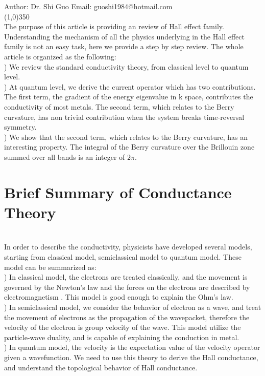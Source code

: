 \documentclass[a4paper]{article}
\begin{document}
Author: Dr. Shi Guo  \hspace{30mm} Email: guoshi1984@hotmail.com\\
\line(1,0){350}\\
\noindent The purpose of this article is providing an review of Hall effect family. Understanding the mechanism of all the physics underlying in the Hall effect family is not an easy task, here we provide a step by step review. The whole article is organized as the following:\\
) We review the standard conductivity theory, from classical level to quantum level.\\
) At quantum level, we derive the current operator which has two contributions. The first term, the gradient of the energy eigenvalue in k space, contributes the conductivity of most metals. The second term, which relates to the Berry curvature, has non trivial contribution when the system breaks time-reversal symmetry.\\
) We show that the second term, which relates to the Berry curvature, has an interesting property. The integral of the Berry curvature over the Brillouin zone summed over all bands is an integer of $2\pi$.\\

\section{Brief Summary of Conductance Theory}\\
\noindent In order to describe the conductivity, physicists have developed several models, starting from classical model, semiclassical model to quantum model. These model can be summarized as:\\
) In classical model, the electrons are treated classically, and the movement is governed by the Newton's law and the forces on the electrons are described by electromagnetism . This model is good enough to explain the Ohm's law.\\
) In semiclassical model, we consider the behavior of electron as a wave, and treat the movement of electrons as the propagation of the wavepacket, therefore the velocity of the electron is group velocity of the wave. This model utilize the particle-wave duality, and is capable of explaining the conduction in metal.\\
) In quantum model, the velocity is the expectation value of the velocity operator given a wavefunction. We need to use this theory to derive the Hall conductance, and understand the topological behavior of Hall conductance.\\
\end{document}
